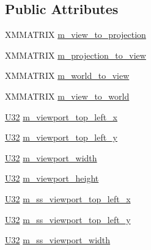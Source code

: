 \subsection*{Public Attributes}
\begin{DoxyCompactItemize}
\item 
X\+M\+M\+A\+T\+R\+IX \hyperlink{structmage_1_1_camera_buffer_aa23d2ecaed10960832215c2397884421}{m\+\_\+view\+\_\+to\+\_\+projection}
\item 
X\+M\+M\+A\+T\+R\+IX \hyperlink{structmage_1_1_camera_buffer_ad64e571c4fd9595c2fcd40bfd602e024}{m\+\_\+projection\+\_\+to\+\_\+view}
\item 
X\+M\+M\+A\+T\+R\+IX \hyperlink{structmage_1_1_camera_buffer_a28db697d7da502479b3e29752122c9f4}{m\+\_\+world\+\_\+to\+\_\+view}
\item 
X\+M\+M\+A\+T\+R\+IX \hyperlink{structmage_1_1_camera_buffer_a2c06f8a346844fb99fadb43d128f9d72}{m\+\_\+view\+\_\+to\+\_\+world}
\item 
\hyperlink{namespacemage_a41c104c036fba3756a74e19f793eeaa1}{U32} \hyperlink{structmage_1_1_camera_buffer_aa1a4a218d604beb0777e9286daad8c8b}{m\+\_\+viewport\+\_\+top\+\_\+left\+\_\+x}
\item 
\hyperlink{namespacemage_a41c104c036fba3756a74e19f793eeaa1}{U32} \hyperlink{structmage_1_1_camera_buffer_af3200b46348fecc86ecca3717767ae6b}{m\+\_\+viewport\+\_\+top\+\_\+left\+\_\+y}
\item 
\hyperlink{namespacemage_a41c104c036fba3756a74e19f793eeaa1}{U32} \hyperlink{structmage_1_1_camera_buffer_a9aec8f6ee54281ae7ec410be846c3658}{m\+\_\+viewport\+\_\+width}
\item 
\hyperlink{namespacemage_a41c104c036fba3756a74e19f793eeaa1}{U32} \hyperlink{structmage_1_1_camera_buffer_a125fd91de1c41cc5bd1a741295bf0536}{m\+\_\+viewport\+\_\+height}
\item 
\hyperlink{namespacemage_a41c104c036fba3756a74e19f793eeaa1}{U32} \hyperlink{structmage_1_1_camera_buffer_a0584c712968ff83e6b22fa0ad83e0da5}{m\+\_\+ss\+\_\+viewport\+\_\+top\+\_\+left\+\_\+x}
\item 
\hyperlink{namespacemage_a41c104c036fba3756a74e19f793eeaa1}{U32} \hyperlink{structmage_1_1_camera_buffer_ac6c5a7af84cef485dd9ddacd018e4a82}{m\+\_\+ss\+\_\+viewport\+\_\+top\+\_\+left\+\_\+y}
\item 
\hyperlink{namespacemage_a41c104c036fba3756a74e19f793eeaa1}{U32} \hyperlink{structmage_1_1_camera_buffer_af7a4718829dc96716c4861bbe00bb7e0}{m\+\_\+ss\+\_\+viewport\+\_\+width}
\item 

\end{DoxyCompactItemize}
